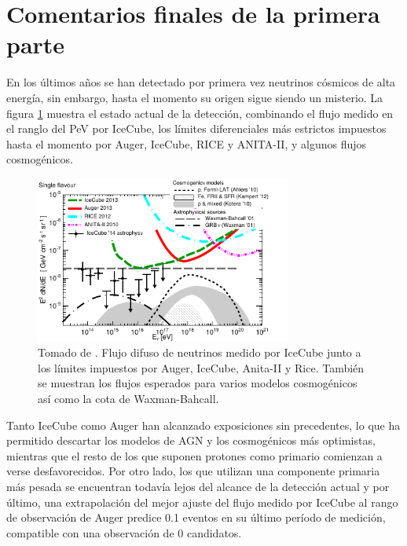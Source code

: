 \section{Comentarios finales de la primera parte}
	En los \'ultimos a\~nos se han detectado por primera vez neutrinos c\'osmicos de alta energ\'ia, sin embargo, hasta el momento su origen sigue siendo un misterio.
	La figura \ref{fig:multimess} muestra el estado actual de la detecci\'on, combinando el flujo medido en el ranglo del PeV por IceCube, los l\'imites diferenciales m\'as estrictos impuestos hasta el momento por Auger, IceCube, RICE y ANITA-II, y algunos flujos cosmog\'enicos.
	\begin{figure}[ht]
		\begin{center}
		\includegraphics[width=0.75\textwidth]{fig/introduccion/1510-02050_multimessenger}
		\caption{\label{fig:multimess} Tomado de \cite{cite:multimess}. Flujo difuso de neutrinos medido por IceCube junto a los l\'imites impuestos por Auger, IceCube, Anita-II y Rice. Tambi\'en se muestran los flujos esperados para varios modelos cosmog\'enicos as\'i como la cota de Waxman-Bahcall.}
		\end{center}
	\end{figure}
	
	Tanto IceCube como Auger han alcanzado exposiciones sin precedentes, lo que ha permitido descartar los modelos de AGN y los cosmog\'enicos m\'as optimistas, mientras que el resto de los que suponen protones como primario comienzan a verse desfavorecidos.
	Por otro lado, los que utilizan una componente primaria m\'as pesada se encuentran todav\'ia lejos del alcance de la detecci\'on actual y por \'ultimo, una extrapolaci\'on del mejor ajuste del flujo medido por IceCube al rango de observaci\'on de Auger predice 0.1 eventos en su \'ultimo per\'iodo de medici\'on, compatible con una observaci\'on de 0 candidatos.
	
